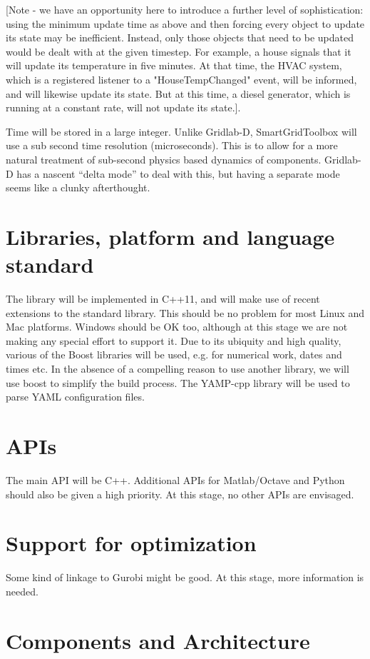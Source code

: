 \documentclass[12pt]{article}
\begin{document}
[Note - we have an opportunity here to introduce a further level of sophistication: using the minimum update time as above and then forcing every object to update its state may be inefficient. Instead, only those objects that need to be updated would be dealt with at the given timestep. For example, a house signals that it will update its temperature in five minutes. At that time, the HVAC system, which is a registered listener to a "HouseTempChanged" event, will be informed, and will likewise update its state. But at this time, a diesel generator, which is running at a constant rate, will not update its state.].

Time will be stored in a large integer. Unlike Gridlab-D, SmartGridToolbox will use a sub second time resolution (microseconds). This is to allow for a more natural treatment of sub-second physics based dynamics of components. Gridlab-D has a nascent ``delta mode'' to deal with this, but having a separate mode seems like a clunky afterthought.

\section{Libraries, platform and language standard}
The library will be implemented in C++11, and will make use of recent extensions to the standard library. This should be no problem for most Linux and Mac platforms. Windows should be OK too, although at this stage we are not making any special effort to support it. Due to its ubiquity and high quality, various of the Boost libraries will be used, e.g. for numerical work, dates and times etc. In the absence of a compelling reason to use another library, we will use boost to simplify the build process. The YAMP-cpp library will be used to parse YAML configuration files.

\section{APIs}
The main API will be C++. Additional APIs for Matlab/Octave and Python should also be given a high priority. At this stage, no other APIs are envisaged.

\section{Support for optimization}
Some kind of linkage to Gurobi might be good. At this stage, more information is needed.

\section{Components and Architecture}
\end{document}
